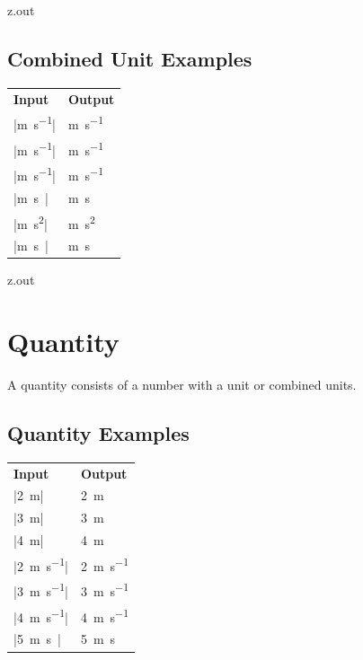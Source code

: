 \MyIO


\begin{VerbatimOut}{z.out}

\subsection{Combined Unit Examples}

{
  \noindent
  \hspace*{2\parindent}\begin{tabular}{@{}ll@{}}
    \textbf{Input}& \textbf{Output}\\
    \tabularspace  
    |\unit{\meter\per\second}|&   \unit{\meter\per\second}\\
    |\unit{\m\per\s}|&            \unit{\m\per\s}\\
    |\unit{m.s^{-1}}|&            \unit{m.s^{-1}}\\
    |\unit{m.s\NE1}|&             \unit{m.s\NE1}\\[6pt]
    |\unit{m.s^2}|&               \unit{m.s^2}\\
    |\unit{m.s\PE2}|&             \unit{m.s\PE2}\\
  \end{tabular}
}
\end{VerbatimOut}

\MyIO


\begin{VerbatimOut}{z.out}

\section{Quantity}

A quantity consists of a number with a unit or combined units.

\subsection{Quantity Examples}

{
  \noindent
  \hspace*{2\parindent}\begin{tabular}{@{}ll@{}}
    \textbf{Input}& \textbf{Output}\\
    \tabularspace
    |\qty{2}{\meter}|&            \qty{2}{\meter}\\
    |\qty{3}{\m}|&                \qty{3}{\m}\\
    |\qty{4}{m}|&                 \qty{4}{m}\\[6pt]
    |\qty{2}{\meter\per\second}|& \qty{2}{\meter\per\second}\\
    |\qty{3}{\m\per\s}|&          \qty{3}{\m\per\s}\\
    |\qty{4}{m.s^{-1}}|&          \qty{4}{m.s^{-1}}\\
    |\qty{5}{m.s\NE1}|&           \qty{5}{m.s\NE1}\\
  \end{tabular}
}
\end{VerbatimOut}

